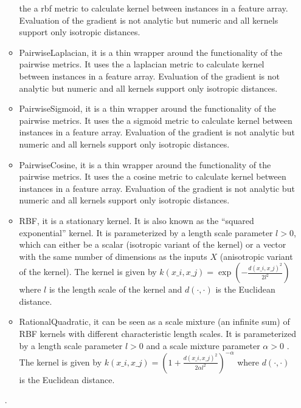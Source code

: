 \begin{itemize}
\begin{itemize}
      the a rbf metric to calculate kernel between instances
      in a feature array. Evaluation of the gradient is not analytic but numeric and all kernels
      support only isotropic distances.                                                    \item
      PairwiseLaplacian, it is a thin wrapper around the functionality of the pairwise metrics. It
      uses the a laplacian metric to calculate kernel between instances
      in a feature array. Evaluation of the gradient is not analytic but numeric and all kernels
      support only isotropic distances.                                                    \item
      PairwiseSigmoid, it is a thin wrapper around the functionality of the pairwise metrics. It
      uses the a sigmoid metric to calculate kernel between instances
      in a feature array. Evaluation of the gradient is not analytic but numeric and all kernels
      support only isotropic distances.                                                    \item
      PairwiseCosine, it is a thin wrapper around the functionality of the pairwise metrics. It uses
      the a cosine metric to calculate kernel between instances
      in a feature array. Evaluation of the gradient is not analytic but numeric and all kernels
      support only isotropic distances.                                                    \item
      RBF, it is a stationary kernel. It is also known as the ``squared exponential'' kernel. It is
      parameterized by a length scale parameter $l>0$,
      which can either be a scalar (isotropic variant of the kernel) or a vector with the same
      number of dimensions as the inputs $X$ (anisotropic variant of the kernel).
      The kernel is given by $k(x\_i, x\_j) = \exp\left(- \frac{d(x\_i, x\_j)^2}{2l^2} \right)$ where
      $l$ is the length scale of the kernel and $d(\cdot,\cdot)$ is the Euclidean distance.
      \item RationalQuadratic, it can be seen as a scale mixture (an infinite sum) of RBF kernels
      with different characteristic length scales. It is parameterized by a length scale parameter
      $l>0$ and a scale mixture parameter $\alpha>0$ . The kernel is given by $k(x\_i, x\_j) = \left(1
      + \frac{d(x\_i, x\_j)^2 }{ 2\alpha  l^2}\right)^{-\alpha}$ where
      $d(\cdot,\cdot)$ is the Euclidean distance.
      \end{itemize}.


\end{itemize}
